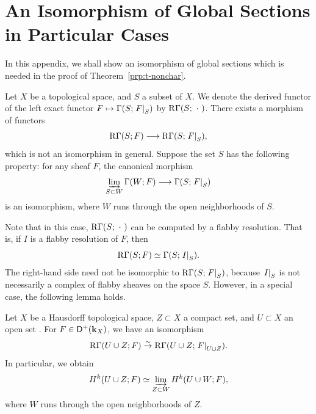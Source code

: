 

\appendix
\section{An Isomorphism of Global Sections in Particular Cases}\label{sec:special-isom}
In this appendix, we shall show 
an isomorphism of global sections 
which is needed in the proof of Theorem~\ref{prp:t-nonchar}.

Let \(X\) be a topological space, 
and \(S\) a subset of \(X\). 
We denote the derived functor of 
the left exact functor \(F \mapsto \Gamma(S; \mres[F]{S})\)
by \(\RG(S; \blk)\). 
There exists a morphism of functors
\[
  \RG(S; F) \longrightarrow \RG(S; \mres[F]{S}),
\]
which is not an isomorphism in general. Suppose the set \(S\) has the following property: for any sheaf \(F\), the canonical morphism
\[
  \indlim[S \subset W] \Gamma(W; F) \longrightarrow \Gamma(S; \mres[F]{S})
\]
is an isomorphism, where \(W\) runs through the open neighborhoods of \(S\).

Note that in this case, \(\RG(S; \blk)\) can be computed by a flabby resolution. That is, if \(I\) is a flabby resolution of \(F\), then
\[
  \RG(S; F) \simeq \Gamma(S; \mres[I]{S}).
\]
The right-hand side need not be isomorphic to
\(\RG(S; \mres[F]{S})\), 
because \(\mres[I]{S}\) is not necessarily 
a complex %
of flabby sheaves on the space \(S\). 
However, in a special case, the following lemma holds.

\begin{Lemma+}\label{lmm:special-isom}
  Let \(X\) be a Hausdorff topological space, 
  \(Z \subset X\) a compact set, 
  and \(U \subset X\) an open set%
  . 
  For \(F \in \Dompl(\kk_X)\), we have an isomorphism 
  \[
    \RG(U \cup Z; F) \simar \RG(U \cup Z; \mres[F]{U \cup Z}).
  \]
  In particular, we obtain
  \[
    H^k(U \cup Z; F) \simeq \indlim[Z \subset W] H^k(U \cup W; F),
  \]
  where \(W\) runs through the open neighborhoods of \(Z\).
\end{Lemma+}

